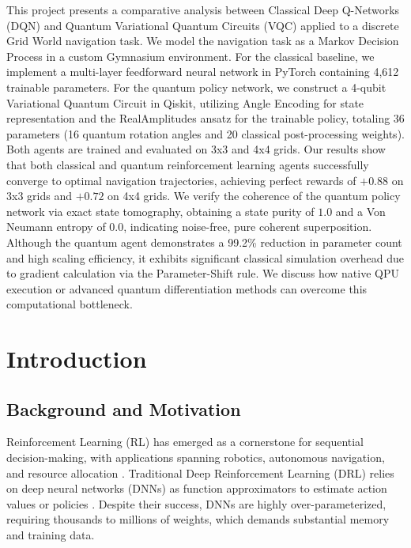 \documentclass[12pt, a4paper]{article}
\begin{document}
This project presents a comparative analysis between Classical Deep Q-Networks (DQN) and Quantum Variational Quantum Circuits (VQC) applied to a discrete Grid World navigation task. We model the navigation task as a Markov Decision Process in a custom Gymnasium environment. For the classical baseline, we implement a multi-layer feedforward neural network in PyTorch containing 4,612 trainable parameters. For the quantum policy network, we construct a 4-qubit Variational Quantum Circuit in Qiskit, utilizing Angle Encoding for state representation and the RealAmplitudes ansatz for the trainable policy, totaling 36 parameters (16 quantum rotation angles and 20 classical post-processing weights). Both agents are trained and evaluated on 3x3 and 4x4 grids. Our results show that both classical and quantum reinforcement learning agents successfully converge to optimal navigation trajectories, achieving perfect rewards of $+0.88$ on 3x3 grids and $+0.72$ on 4x4 grids. We verify the coherence of the quantum policy network via exact state tomography, obtaining a state purity of $1.0$ and a Von Neumann entropy of $0.0$, indicating noise-free, pure coherent superposition. Although the quantum agent demonstrates a 99.2\% reduction in parameter count and high scaling efficiency, it exhibits significant classical simulation overhead due to gradient calculation via the Parameter-Shift rule. We discuss how native QPU execution or advanced quantum differentiation methods can overcome this computational bottleneck.


\newpage

\section{Introduction}

\subsection{Background and Motivation}

Reinforcement Learning (RL) has emerged as a cornerstone for sequential decision-making, with applications spanning robotics, autonomous navigation, and resource allocation \cite{sutton2018}. Traditional Deep Reinforcement Learning (DRL) relies on deep neural networks (DNNs) as function approximators to estimate action values or policies \cite{mnih2015}. Despite their success, DNNs are highly over-parameterized, requiring thousands to millions of weights, which demands substantial memory and training data. 
\end{document}
